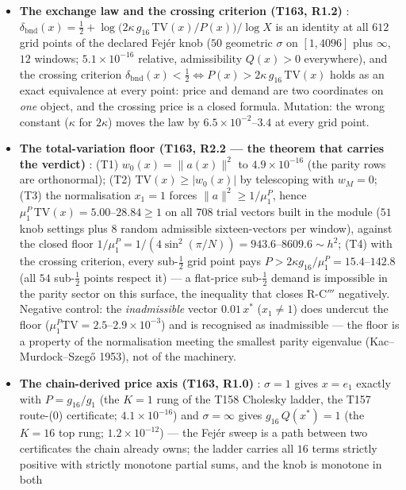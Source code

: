 \documentclass[11pt,a4paper]{article}
\begin{document}
\begin{itemize}[leftmargin=1.5em]
\item \textbf{The exchange law and the crossing criterion (T163, R1.2)} \mE:
$\delta_{\mathrm{bnd}}(x)=\tfrac12+\log\!\bigl(2\kappa\,g_{16}\,\mathrm{TV}(x)/P(x)\bigr)/\log X$
is an identity at all $612$ grid points of the declared Fej\'er knob ($50$ geometric
$\sigma$ on $[1,4096]$ plus $\infty$, $12$ windows; $5.1\times10^{-16}$ relative,
admissibility $Q(x)>0$ everywhere), and the crossing criterion
$\delta_{\mathrm{bnd}}(x)<\tfrac12\iff P(x)>2\kappa\,g_{16}\,\mathrm{TV}(x)$ holds as an
exact equivalence at every point: price and demand are two coordinates on \emph{one}
object, and the crossing price is a closed formula. Mutation: the wrong constant
($\kappa$ for $2\kappa$) moves the law by $6.5\times10^{-2}$--$3.4$ at every grid point.
\item \textbf{The total-variation floor (T163, R2.2 --- the theorem that carries the
verdict)} \mE: (T1) $w_0(x)=\|a(x)\|^2$ to $4.9\times10^{-16}$ (the parity rows are
orthonormal); (T2) $\mathrm{TV}(x)\ge|w_0(x)|$ by telescoping with $w_M=0$; (T3) the
normalisation $x_1=1$ forces $\|a\|^2\ge1/\mu^P_1$, hence
$\mu^P_1\,\mathrm{TV}(x)=5.00$--$28.84\ge1$ on all $708$ trial vectors built in the module
($51$ knob settings plus $8$ random admissible sixteen-vectors per window), against the
closed floor $1/\mu^P_1=1/(4\sin^2(\pi/N))=943.6$--$8609.6\sim h^2$; (T4) with the
crossing criterion, every sub-$\tfrac12$ grid point pays
$P>2\kappa g_{16}/\mu^P_1=15.4$--$142.8$ (all $54$ sub-$\tfrac12$ points respect it) ---
a flat-price sub-$\tfrac12$ demand is impossible in the parity sector on this surface,
the inequality that closes R-C$'''$ negatively. Negative control: the \emph{inadmissible}
vector $0.01\,x^*$ ($x_1\ne1$) does undercut the floor
($\mu^P_1\mathrm{TV}=2.5$--$2.9\times10^{-3}$) and is recognised as inadmissible --- the
floor is a property of the normalisation meeting the smallest parity eigenvalue
(Kac--Murdock--Szeg\H{o} 1953), not of the machinery.
\item \textbf{The chain-derived price axis (T163, R1.0)} \mE: $\sigma=1$ gives $x=e_1$
exactly with $P=g_{16}/g_1$ (the $K=1$ rung of the T158 Cholesky ladder, the T157
route-(0) certificate; $4.1\times10^{-16}$) and $\sigma=\infty$ gives
$g_{16}\,Q(x^*)=1$ (the $K=16$ top rung; $1.2\times10^{-12}$) --- the Fej\'er sweep is a
path between two certificates the chain already owns; the ladder carries all $16$ terms
strictly positive with strictly monotone partial sums, and the knob is monotone in both

\end{itemize}
\end{document}
